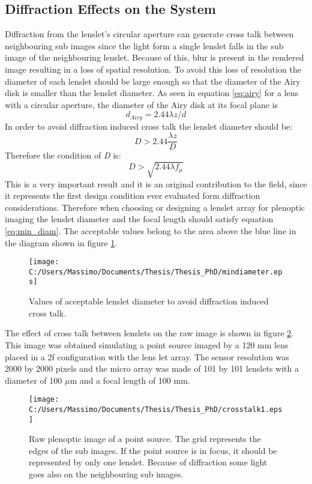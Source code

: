 \subsection{Diffraction Effects on the System}
\label{sec:diffraction}
Diffraction from the lenslet's circular aperture can generate cross talk between neighbouring sub images since the light form a single lenslet falls in the sub image of the neighbouring lenslet. Because of this, blur is present in the rendered image resulting in a loss of spatial resolution. To avoid this loss of resolution the diameter of each lenslet should be large enough so that the diameter of the Airy disk is smaller than the lenslet diameter. As seen in equation \ref{eq:airy} for a lens with a circular aperture, the diameter of the Airy disk at its focal plane is
\begin{equation}
\label{eq:airy1}
d_{Airy} = 2.44\lambda z/d
\end{equation}
 In order to avoid diffraction induced cross talk the lenslet diameter should be:
\begin{equation}
\label{eq:lenscond}
D>2.44 \dfrac{\lambda z}{D}
\end{equation} 
Therefore the condition of \textit{D} is:
\begin{equation}
\label{eq:min_diam}
D>\sqrt{2.44\lambda f_{\mu}}
\end{equation}
This is a very important result and it is an original contribution to the field, since it represents the first design condition ever evaluated form diffraction considerations. 
Therefore when choosing or designing a lenslet array for plenoptic imaging the lenslet diameter and the focal length should satisfy equation \ref{eq:min_diam}. The acceptable values belong to the area above the blue line in the diagram shown in figure \ref{fig:mindiam}.
\begin{figure}[H]
	\centering
	\texttt{[image: C:/Users/Massimo/Documents/Thesis/Thesis\_PhD/mindiameter.eps]}
	\caption{\label{fig:mindiam} Values of acceptable lenslet diameter to avoid diffraction induced cross talk. }
\end{figure}
The effect of cross talk between lenslets on the raw image is shown in figure \ref{fig:crosstalk1}.
This image was obtained simulating a point source imaged by a 120 mm lens placed in a 2f configuration with the lens let array. The sensor resolution was 2000 by 2000 pixels and the micro array was made of 101 by 101 lenslets with a diameter of 100 $\mu$m and a focal length of 100 mm.
\begin{figure}[H]
	\centering
	\texttt{[image: C:/Users/Massimo/Documents/Thesis/Thesis\_PhD/crosstalk1.eps]}
	\caption{\label{fig:crosstalk1} Raw plenoptic image of a point source. The grid represents the edges of the sub images. If the point source is in focus, it should be represented by only one lenslet. Because of diffraction some light goes also on the neighbouring sub images. }
\end{figure}
